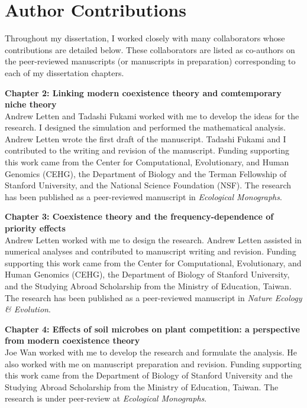 \section{Author Contributions}
	Throughout my dissertation, I worked closely with many collaborators whose contributions are detailed below. These collaborators are listed as co-authors on the peer-reviewed manuscripts (or manuscripts in preparation) corresponding to each of my dissertation chapters.
\par


\noindent \textbf{Chapter 2: Linking modern coexistence theory and comtemporary niche theory}\\
\noindent Andrew Letten and Tadashi Fukami worked with me to develop the ideas for the research. I designed the simulation and performed the mathematical analysis. Andrew Letten wrote the first draft of the manuscript. Tadashi Fukami and I contributed to the writing and revision of the manuscript. Funding supporting this work came from the Center for Computational, Evolutionary, and Human Genomics (CEHG), the Department of Biology and the Terman Fellowship of Stanford University, and the National Science Foundation (NSF). The research has been published as a peer-reviewed manuscript in \textit{Ecological Monographs}.
\bigskip


\noindent \textbf{Chapter 3: Coexistence theory and the frequency-dependence of priority effects}\\
\noindent Andrew Letten worked with me to design the research. Andrew Letten assisted in numerical analyses and contributed to manuscript writing and revision. Funding supporting this work came from the Center for Computational, Evolutionary, and Human Genomics (CEHG), the Department of Biology of Stanford University, and the Studying Abroad Scholarship from the Ministry of Education, Taiwan. The research has been published as a peer-reviewed manuscript in \textit{Nature Ecology \& Evolution}.
\bigskip


\noindent \textbf{Chapter 4: Effects of soil microbes on plant competition: a perspective from modern coexistence theory}\\
\noindent Joe Wan worked with me to develop the research and formulate the analysis. He also worked with me on manuscript preparation and revision. Funding supporting this work came from the Department of Biology of Stanford University and the Studying Abroad Scholarship from the Ministry of Education, Taiwan. The research is under peer-review at \textit{Ecological Monographs}.
\bigskip


